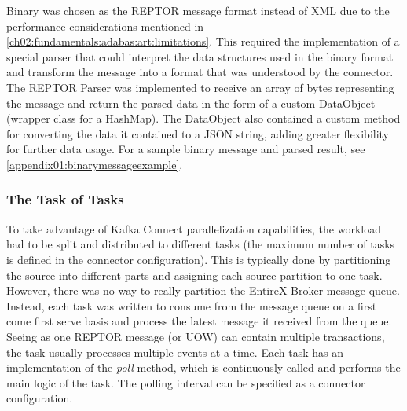 Binary was chosen as the \ac{REPTOR} message format instead of XML due to the performance considerations mentioned in \ref{ch02:fundamentals:adabas:art:limitations}. This required the implementation of a special parser that could interpret the data structures used in the binary format and transform the message into a format that was understood by the connector. The \ac{REPTOR} Parser was implemented to receive an array of bytes representing the message and return the parsed data in the form of a custom DataObject (wrapper class for a HashMap). The DataObject also contained a custom method for converting the data it contained to a JSON string, adding greater flexibility for further data usage. For a sample binary message and parsed result, see \ref{appendix01:binarymessageexample}.




\subsubsection{The Task of Tasks}
To take advantage of Kafka Connect parallelization capabilities, the workload had to be split and distributed to different tasks (the maximum number of tasks is defined in the connector configuration). This is typically done by partitioning the source into different parts and assigning each source partition to one task. However, there was no way to really partition the EntireX Broker message queue. Instead, each task was written to consume from the message queue on a first come first serve basis and process the latest message it received from the queue. Seeing as one \ac{REPTOR} message (or \ac{UOW}) can contain multiple transactions, the task usually processes multiple events at a time. Each task has an implementation of the \textit{poll} method, which is continuously called and performs the main logic of the task. The polling interval can be specified as a connector configuration.

